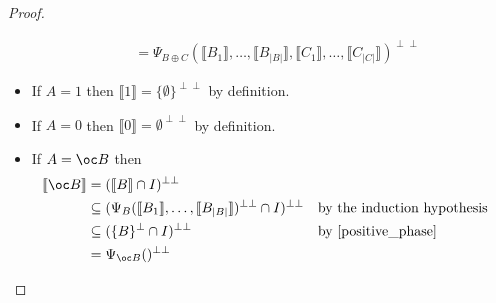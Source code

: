 \documentclass[11pt]{article}
\newcommand\size[1]{{\lvert #1 \rvert}}
\newcommand\sem[1]{{\llbracket #1 \rrbracket}}
\newcommand\biperp{{\perp\perp}}
\begin{document}
\begin{proof}
\begin{itemize}
\begin{align*}
            &= \Psi_{B \oplus C}(\sem{B_1}, \dots, \sem{B_\size{B}}, \sem{C_1}, \dots, \sem{C_\size{C}})^\biperp
        \end{align*}
        \item If $A = 1$ then $\sem{1} = \{\emptyset\}^\biperp$ by definition.
        \item If $A = 0$ then $\sem{0} = \emptyset^\biperp$ by definition.
        \item If $A = \oc B$ then \begin{align*}
            \sem{\oc B} &= (\sem{B} \cap I)^\biperp \\
            &\subseteq (\Psi_B(\sem{B_1},\dots,\sem{B_\size{B}})^\biperp \cap I)^\biperp &&\text{by the induction hypothesis}\\
            &\subseteq (\{B\}^\perp \cap I)^\biperp &&\text{by \cref{positive_phase}}\\
            &= \Psi_{\oc B}()^\biperp
        \end{align*}
    \end{itemize}
\end{proof}
\end{document}
